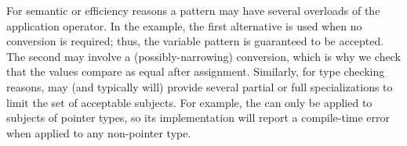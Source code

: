 \noindent
For semantic or efficiency reasons a pattern may have several overloads 
of the application operator. In the example, the first alternative is used when no 
conversion is required; thus, the variable pattern is guaranteed to be accepted.
The second may involve a (possibly-narrowing) conversion, which is why we check 
that the values compare as equal after assignment. Similarly, for type checking 
reasons,  may (and typically will) provide several partial 
or full specializations to limit the set of acceptable subjects. For example, the
 can only be applied to subjects 
of pointer types, so its implementation will report a compile-time error when 
applied to any non-pointer type. 
%
%

